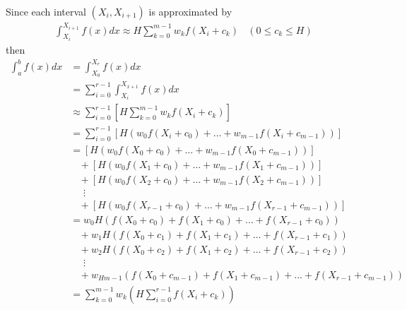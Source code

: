 \documentclass[12pt]{article}
\begin{document}
\noindent Since each interval $(X_i, X_{i+1})$ is approximated by
\begin{align*}
	\int_{X_i}^{X_{i+1}} f(x) dx \approx H \sum_{k=0}^{m-1}w_kf(X_i + c_k)\ \ \ \ (0 \leq c_k \leq H)
\end{align*}
then
\begin{align*}
	\int_a^b f(x) dx &= \int_{X_0}^{X_r} f(x) dx \\
	&= \sum_{i=0}^{r-1}\int_{X_i}^{X_{x+1}} f(x) dx \\
	&\approx \sum_{i=0}^{r-1} \left[H \sum_{k=0}^{m-1}w_kf(X_i + c_k)\right] \\
	&= \sum_{i=0}^{r-1} \left[H\left(w_0f(X_i + c_0) + \dots + w_{m-1}f(X_i + c_{m-1})\right)\right] \\ &= \left[H\left(w_0f(X_0 + c_0) + \dots + w_{m-1}f(X_0 + c_{m-1})\right)\right] \\
	&\ \ \ \ + \left[H\left(w_0f(X_1 + c_0) + \dots + w_{m-1}f(X_1 + c_{m-1})\right)\right] \\
	&\ \ \ \ + \left[H\left(w_0f(X_2 + c_0) + \dots + w_{m-1}f(X_2 + c_{m-1})\right)\right] \\
	&\ \ \ \ \ \ \vdots \\
	&\ \ \ \ + \left[H\left(w_0f(X_{r-1} + c_0) + \dots + w_{m-1}f(X_{r-1} + c_{m-1})\right)\right] \\
	&= w_0H(f(X_0 + c_0) + f(X_1 + c_0) + \dots + f(X_{r-1} + c_0)) \\
	&\ \ \ \ + w_1H(f(X_0 + c_1) + f(X_1 + c_1) + \dots + f(X_{r-1} + c_1)) \\
	&\ \ \ \ + w_2H(f(X_0 + c_2) + f(X_1 + c_2) + \dots + f(X_{r-1} + c_2)) \\
	&\ \ \ \ \ \ \vdots \\
	&\ \ \ \ + w_{Hm-1}(f(X_0 + c_{m-1}) + f(X_1 + c_{m-1}) + \dots + f(X_{r-1} + c_{m-1})) \\
	&= \sum_{k=0}^{m-1}w_k\left(H\sum_{i=0}^{r-1}f(X_i + c_k)\right)
\end{align*}
\end{document}
